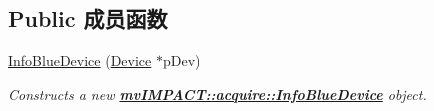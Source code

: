\subsection*{Public 成员函数}
\begin{DoxyCompactItemize}
\item 
\hyperlink{classmv_i_m_p_a_c_t_1_1acquire_1_1_info_blue_device_a9285bf45e3ecce242611f00eb5d8063f}{Info\+Blue\+Device} (\hyperlink{classmv_i_m_p_a_c_t_1_1acquire_1_1_device}{Device} $\ast$p\+Dev)
\begin{DoxyCompactList}\small\item\em Constructs a new {\bfseries \hyperlink{classmv_i_m_p_a_c_t_1_1acquire_1_1_info_blue_device}{mv\+I\+M\+P\+A\+C\+T\+::acquire\+::\+Info\+Blue\+Device}} object. \end{DoxyCompactList}\end{DoxyCompactItemize}
